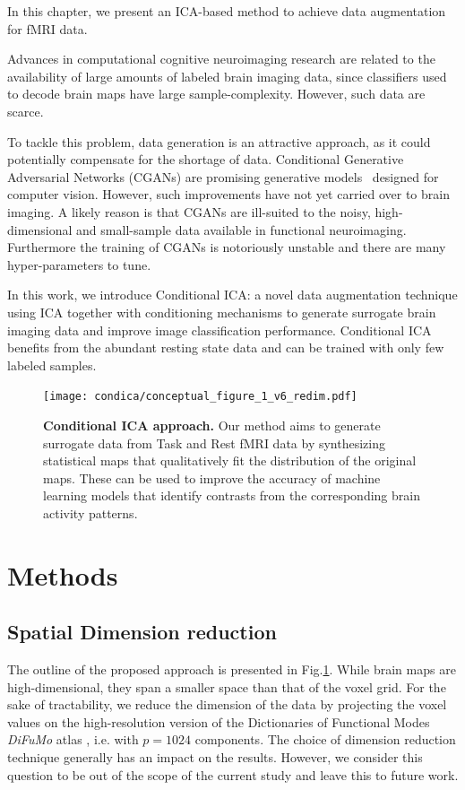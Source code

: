 In this chapter, we present an ICA-based method to achieve data augmentation for fMRI data.

  Advances in computational cognitive neuroimaging research are
  related to the availability of large amounts of labeled brain
imaging data, since classifiers used to decode brain maps have large
sample-complexity.
%
However, such data are scarce.
%

To tackle this problem, data generation is an attractive approach, as
it could potentially compensate for the shortage of data.
Conditional Generative Adversarial Networks (CGANs) are promising generative
models~\cite{goodfellow2014generative} designed for computer vision.
% 
However, such improvements have not yet carried over to brain imaging. A likely
reason is that CGANs are ill-suited to the noisy, high-dimensional and
small-sample data available in functional neuroimaging. 
% 
Furthermore the training of CGANs is notoriously unstable and there are many hyper-parameters to tune.
% 

  In this work, we introduce Conditional ICA: a novel data augmentation technique using ICA together with conditioning mechanisms to generate surrogate brain imaging data and improve image classification performance.
  Conditional ICA benefits from the abundant
  resting state data and can be trained with only few labeled samples.


%
\begin{figure}
\centerline{\texttt{[image: condica/conceptual\_figure\_1\_v6\_redim.pdf]}}
\caption{\textbf{Conditional ICA approach.} Our method aims to
  generate surrogate data from Task and Rest fMRI data by synthesizing
  statistical maps that qualitatively fit the distribution of the
  original maps. These can be used to improve the accuracy of
  machine learning models that identify contrasts from the
  corresponding brain activity patterns.}
\label{Fig0}
\end{figure}



\section{Methods}

\subsection{Spatial Dimension reduction} 
The outline of the proposed approach is presented in Fig.\ref{Fig0}.
%
While brain maps are high-dimensional, they span a smaller space than that of
the voxel grid. 
%
For the sake of tractability, we reduce the dimension of the data by projecting the voxel values on the
high-resolution version of the Dictionaries of Functional Modes \emph{DiFuMo}
atlas \cite{dadi_fine-grain_2020}, i.e. with $p=1024$ components.
%
The choice of dimension reduction technique generally has an impact on the
results. However, we consider this question to be out of the scope of the current study and leave this to future work.

